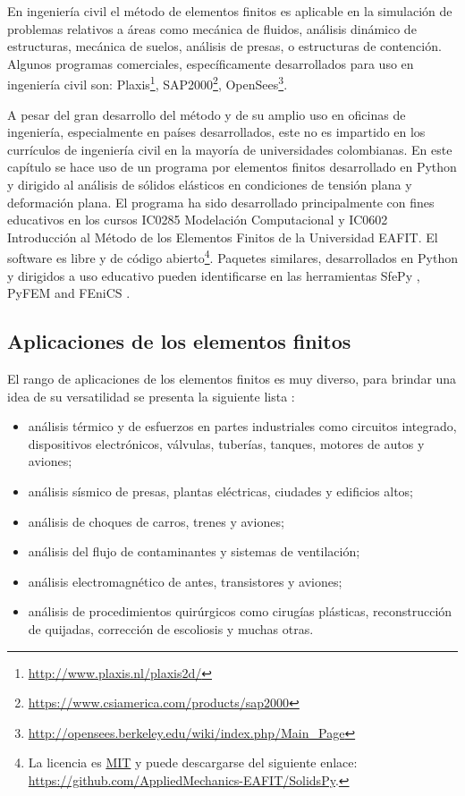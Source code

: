 En ingeniería civil el método de elementos finitos es aplicable en la simulación de problemas relativos a áreas como mecánica de fluidos, análisis dinámico de estructuras, mecánica de suelos, análisis de presas, o estructuras de contención. Algunos programas comerciales, específicamente desarrollados para uso en ingeniería civil son: Plaxis\footnote{\url{http://www.plaxis.nl/plaxis2d/}}, SAP2000\footnote{\url{https://www.csiamerica.com/products/sap2000}}, OpenSees\footnote{\url{http://opensees.berkeley.edu/wiki/index.php/Main_Page}}.

A pesar del gran desarrollo del método y de su amplio uso en oficinas de 
ingeniería, especialmente en países desarrollados, este no es impartido en los 
currículos de ingeniería civil en la mayoría de universidades colombianas. En 
este capítulo se hace uso de un programa por elementos finitos desarrollado en 
Python y dirigido al análisis de sólidos elásticos en condiciones de tensión 
plana y deformación plana. El programa ha sido desarrollado principalmente con 
fines educativos en los cursos IC0285 Modelación Computacional y IC0602 
Introducción al Método de los Elementos Finitos de la Universidad EAFIT. El 
software es libre y de código abierto\footnote{La licencia es 
\href{https://opensource.org/licenses/MIT}{MIT} y puede descargarse del 
siguiente enlace: \url{https://github.com/AppliedMechanics-EAFIT/SolidsPy}.}. 
Paquetes similares, desarrollados en Python y dirigidos a uso educativo pueden 
identificarse en las herramientas SfePy \cite{sfepy}, PyFEM \cite{pyfem} and 
FEniCS \cite{fenics}.

\subsection{Aplicaciones de los elementos finitos}

El rango de aplicaciones de los elementos finitos es muy diverso, para brindar una idea de su versatilidad se presenta la siguiente lista \cite{book:first_fem}:
\begin{itemize}
	\item análisis térmico y de esfuerzos en partes industriales como circuitos integrado, dispositivos electrónicos, válvulas, tuberías, tanques, motores de autos y aviones;
	\item análisis sísmico de presas, plantas eléctricas, ciudades y edificios altos;
	\item análisis de choques de carros, trenes y aviones;
	\item análisis del flujo de contaminantes y sistemas de ventilación;
	\item análisis electromagnético de antes, transistores y aviones;
	\item análisis de procedimientos quirúrgicos como cirugías plásticas, reconstrucción de quijadas, corrección de escoliosis y muchas otras.
\end{itemize}

